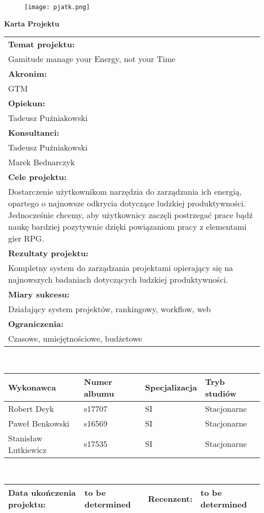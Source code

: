 \documentclass[a4paper,11pt]{report}
\begin{document}
\let\cleardoublepage\clearpage
\begin{figure}[ht]
\centering
\texttt{[image: pjatk.png]}
\end{figure}
\begin{center}
\textbf{\huge Karta Projektu}\\
\vspace{1cm}
\begin{tabular}{|p{15cm}|}
\hline
\textbf{Temat projektu:}\\Gamitude manage your Energy, not your Time\\ 
\hline
\textbf{Akronim:}\\GTM\\
\hline
\textbf{Opiekun:}\\Tadeusz Puźniakowski  \\
\hline
\textbf{Konsultanci:}\\Tadeusz Puźniakowski\\Marek Bednarczyk \\
\hline
\textbf{Cele projektu:}
\\Dostarczenie użytkownikom narzędzia do zarządzania ich energią,
 opartego o najnowsze odkrycia dotyczące ludzkiej produktywności.
Jednocześnie chcemy,
 aby użytkownicy zaczęli postrzegać prace bądź naukę bardziej pozytywnie dzięki powiązaniom pracy z elementami gier RPG.\\
\hline
\textbf{Rezultaty projektu:}\\Kompletny system do zarządzania projektami opierający się na najnowszych badaniach dotyczących ludzkiej produktywności. \\
\hline
\textbf{Miary sukcesu:}\\Działający system projektów, rankingowy, workflow, web \\
\hline
\textbf{Ograniczenia:}\\Czasowe, umiejętnościowe, budżetowe \\
\hline
\end{tabular}\\
\vspace{1cm}
\begin{tabular}{|l|l|l|l|}
\hline
\textbf{Wykonawca} & \textbf{Numer albumu}& \textbf{Specjalizacja}& \textbf{Tryb studiów} \\
\hline
Robert Deyk&s17707&SI&Stacjonarne \\
\hline
Paweł Benkowski&s16569&SI&Stacjonarne\\
\hline
Stanisław Lutkiewicz&s17535&SI&Stacjonarne \\
\hline
\end{tabular}\\
\vspace{1cm}
\begin{tabular}{|l|l|l|l|}
\hline
\textbf{Data ukończenia projektu:} & to be determined & \textbf{Recenzent:} & to be determined\\
\hline
\end{tabular}
\end{center}
\tableofcontents
\end{document}
